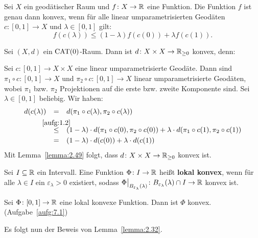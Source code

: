 \begin{lemma}
\label{lemma:2.49}
	Sei $X$ ein geodätischer Raum und $f \colon X \rightarrow \mathbb{R}$ eine Funktion.
	Die Funktion $f$ ist genau dann konvex, wenn für alle linear umparametrisierten Geodäten $c \colon [0,1] \rightarrow X$ und $\lambda \in [0,1]$ gilt:
	\[
		f(c(\lambda)) \leq (1-\lambda) f(c(0)) + \lambda f(c(1)).
	\]
\end{lemma}

\begin{beispiel}
\label{bsp:2.50}
	Sei $(X,d)$ ein $\operatorname{CAT(0)}$-Raum.
	Dann ist $d\colon X \times X \rightarrow \mathbb{R}_{\geq 0}$ konvex, denn:
	
	Sei $c \colon [0,1] \rightarrow X \times X$ eine linear umparametrisierte Geodäte.
	Dann sind $\pi_1 \circ c \colon [0,1] \rightarrow X$  und $\pi_2 \circ c \colon [0,1] \rightarrow X$ linear umparametrisierte Geodäten, wobei $\pi_1$ bzw. $\pi_2$ Projektionen auf die erste bzw. zweite Komponente sind.
	Sei $\lambda \in [0,1]$ beliebig.
	Wir haben:
	\begin{align*}
		d(c(\lambda)) &\stack{}{=} d(\pi_1 \circ c(\lambda), \pi_2 \circ c(\lambda)) \\
		&\stack{\ref{aufg:1.2}}{\leq} (1-\lambda) \cdot d(\pi_1 \circ c(0),\pi_2 \circ c(0)) + \lambda \cdot d(\pi_1 \circ c(1), \pi_2 \circ c(1)) \\
		&\stack{}{=} (1-\lambda) \cdot d(c(0)) + \lambda \cdot d(c(1))
	\end{align*}
	Mit Lemma~\ref{lemma:2.49} folgt, dass $d \colon X \times X \rightarrow \mathbb{R}_{\geq 0}$ konvex ist.
\end{beispiel}

\begin{definition}
\label{def:2.51}
	Sei $I \subseteq \mathbb{R}$ ein Intervall.
	Eine Funktion $\Phi \colon I \rightarrow \mathbb{R}$ heißt \textbf{lokal konvex}, wenn für alle $\lambda \in I$ ein $\varepsilon_\lambda > 0$ existiert, sodass $\Phi \big|_{B_{\varepsilon_\lambda}(\lambda)} \colon B_{\varepsilon_\lambda}(\lambda) \cap I \rightarrow \mathbb{R}$ konvex ist. 
\end{definition}

\begin{lemma}
\label{lemma:2.52}
	Sei $\Phi\colon [0,1] \rightarrow \mathbb{R}$ eine lokal konvexe Funktion.
	Dann ist $\Phi$ konvex. (Aufgabe~\ref{aufg:7.1})
\end{lemma}

Es folgt nun der Beweis von Lemma~\ref{lemma:2.32}.

